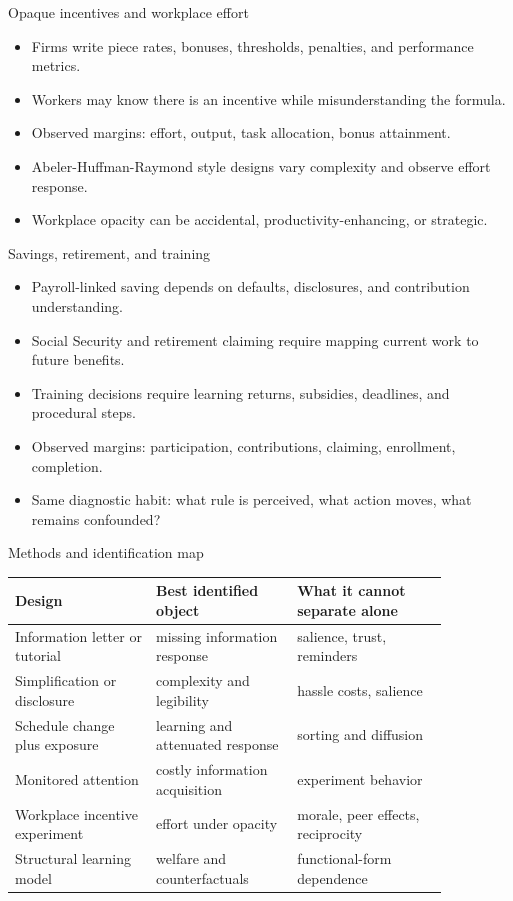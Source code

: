 \documentclass[aspectratio=169,11pt]{beamer}
\begin{document}
\begin{frame}{Opaque incentives and workplace effort}
\begin{itemize}
    \item Firms write piece rates, bonuses, thresholds, penalties, and performance metrics.
    \item Workers may know there is an incentive while misunderstanding the formula.
    \item Observed margins: effort, output, task allocation, bonus attainment.
    \item Abeler-Huffman-Raymond style designs vary complexity and observe effort response.
    \item Workplace opacity can be accidental, productivity-enhancing, or strategic.
\end{itemize}
\end{frame}

\begin{frame}{Savings, retirement, and training}
\begin{itemize}
    \item Payroll-linked saving depends on defaults, disclosures, and contribution understanding.
    \item Social Security and retirement claiming require mapping current work to future benefits.
    \item Training decisions require learning returns, subsidies, deadlines, and procedural steps.
    \item Observed margins: participation, contributions, claiming, enrollment, completion.
    \item Same diagnostic habit: what rule is perceived, what action moves, what remains confounded?
\end{itemize}
\end{frame}

\begin{frame}{Methods and identification map}
\scriptsize
\begin{tabular}{p{0.28\linewidth} p{0.28\linewidth} p{0.30\linewidth}}
\toprule
Design & Best identified object & What it cannot separate alone \\
\midrule
Information letter or tutorial & missing information response & salience, trust, reminders \\
Simplification or disclosure & complexity and legibility & hassle costs, salience \\
Schedule change plus exposure & learning and attenuated response & sorting and diffusion \\
Monitored attention & costly information acquisition & experiment behavior \\
Workplace incentive experiment & effort under opacity & morale, peer effects, reciprocity \\
Structural learning model & welfare and counterfactuals & functional-form dependence \\
\bottomrule
\end{tabular}
\end{frame}
\end{document}
